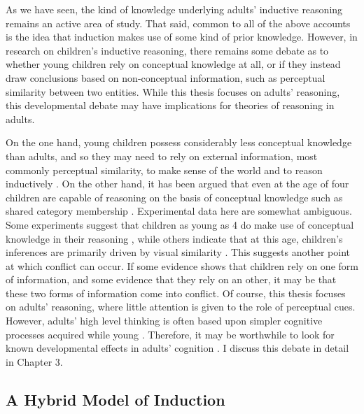 As we have seen, the kind of knowledge underlying adults' inductive reasoning
remains an active area of study.
That said, common to all of the above accounts
is the idea that induction makes use of some kind of prior knowledge.
However, in research on children's inductive reasoning,
there remains some debate as to whether
young children rely on conceptual knowledge at all,
or if they instead draw conclusions based on non-conceptual information,
such as perceptual similarity between two entities.
While this thesis focuses on adults' reasoning,
this developmental debate
may have implications for theories of reasoning in adults.

On the one hand, young children possess considerably less
conceptual knowledge than adults,
and so they may need to rely on external information,
most commonly perceptual similarity,
to make sense of the world and to reason inductively
\citep{Sloutsky2003,Sloutsky2004}.
On the other hand, it has been argued that
even at the age of four children are capable
of reasoning on the basis of conceptual knowledge
such as shared category membership \citep{Gelman2004a,Gelman2011a}.
Experimental data here are somewhat ambiguous.
Some experiments suggest that children as young as 4
do make use of conceptual knowledge in their reasoning \citep{Gelman2013c,Gelman1986},
while others indicate that at this age,
children's inferences are primarily driven by visual similarity
\citep{Badger2012,Sloutsky2007,Sloutsky2015}.
This suggests another point at which conflict can occur.
If some evidence shows that children rely on one form of information,
and some evidence that they rely on an other,
it may be that these two forms of information come into conflict.
Of course, this thesis focuses on adults' reasoning,
where little attention is given to the role of perceptual cues.
However, adults' high level thinking
is often based upon simpler cognitive processes acquired while young
\citep{Barsalou2007,Vygotsky1980}.
Therefore, it may be worthwhile to look for
known developmental effects in adults' cognition
\citep[see, for instance,][for signs of
  A-not-B error, usually thought to be overcome by 12 months,
  in adults]{Falke2013}.
I discuss this debate in detail in Chapter 3.



\subsection{A Hybrid Model of Induction}
\label{subsec:chapter1-knowledge-hybrid}


